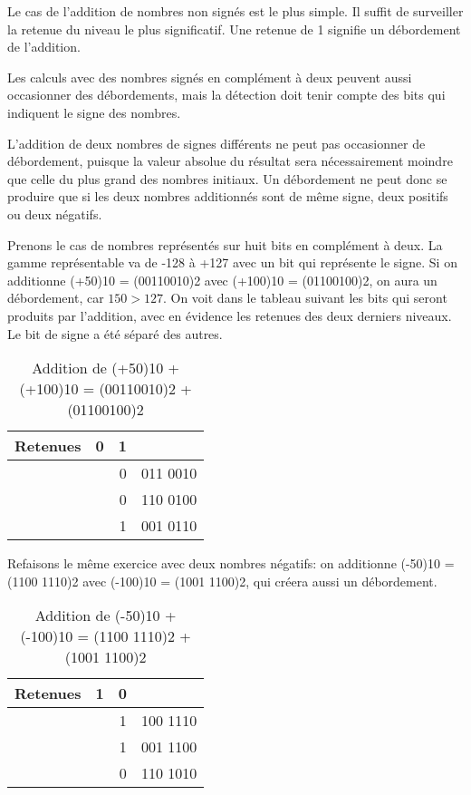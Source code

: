 \documentclass[letter, oneside]{book}
\begin{document}
\begin{enumerate}
Le cas de l'addition de nombres non signés est le plus simple. Il
suffit de surveiller la retenue du niveau le plus significatif. Une
retenue de 1 signifie un débordement de l'addition.

Les calculs avec des nombres signés en complément à deux peuvent aussi
occasionner des débordements, mais la détection doit tenir compte des
bits qui indiquent le signe des nombres.

L'addition de deux nombres de signes différents ne peut pas
occasionner de débordement, puisque la valeur absolue du résultat sera
nécessairement moindre que celle du plus grand des nombres
initiaux. Un débordement ne peut donc se produire que si les deux
nombres additionnés sont de même signe, deux positifs ou deux
négatifs.

Prenons le cas de nombres représentés sur huit bits en complément à
deux. La gamme représentable va de -128 à +127 avec un bit qui
représente le signe. Si on additionne (+50)10 = (00110010)2 avec
(+100)10 = (01100100)2, on aura un débordement, car \(150 > 127\). On
voit dans le tableau suivant les bits qui seront produits par
l'addition, avec en évidence les retenues des deux derniers
niveaux. Le bit de signe a été séparé des autres.

\begin{table}[htbp]
\caption{\label{tab:orgd5d7a1f}Addition de (+50)10 + (+100)10 = (00110010)2 + (01100100)2}
\centering
\begin{tabular}{lrrl}
Retenues & 0 & 1 & \\[0pt]
\hline
 &  & 0 & 011 0010\\[0pt]
 &  & 0 & 110 0100\\[0pt]
\hline
 &  & 1 & 001 0110\\[0pt]
\end{tabular}
\end{table}

Refaisons le même exercice avec deux nombres négatifs: on additionne
(-50)10 = (1100 1110)2 avec (-100)10 = (1001 1100)2, qui créera aussi un
débordement.

\begin{table}[htbp]
\caption{\label{tab:org01f5839}Addition de (-50)10 + (-100)10 = (1100 1110)2 + (1001 1100)2}
\centering
\begin{tabular}{lrrl}
Retenues & 1 & 0 & \\[0pt]
\hline
 &  & 1 & 100 1110\\[0pt]
 &  & 1 & 001 1100\\[0pt]
\hline
 &  & 0 & 110 1010\\[0pt]
\end{tabular}
\end{table}


\end{enumerate}
\end{document}
